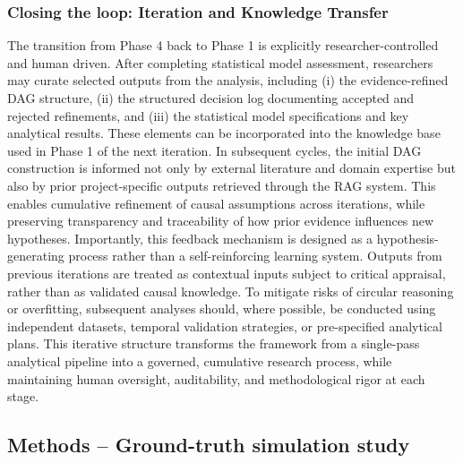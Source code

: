 \documentclass[sn-vancouver-num]{sn-jnl}
\begin{document}
\subsubsection{Closing the loop: Iteration and Knowledge Transfer}
The transition from Phase 4 back to Phase 1 is explicitly researcher-controlled and human driven. After completing statistical model assessment, researchers may curate selected outputs from the analysis, including (i) the evidence-refined DAG structure, (ii) the structured decision log documenting accepted and rejected refinements, and (iii) the statistical model specifications and key analytical results. These elements can be incorporated into the knowledge base used in Phase 1 of the next iteration. In subsequent cycles, the initial DAG construction is informed not only by external literature and domain expertise but also by prior project-specific outputs retrieved through the RAG system. This enables cumulative refinement of causal assumptions across iterations, while preserving transparency and traceability of how prior evidence influences new hypotheses. Importantly, this feedback mechanism is designed as a hypothesis-generating process rather than a self-reinforcing learning system. Outputs from previous iterations are treated as contextual inputs subject to critical appraisal, rather than as validated causal knowledge. To mitigate risks of circular reasoning or overfitting, subsequent analyses should, where possible, be conducted using independent datasets, temporal validation strategies, or pre-specified analytical plans. This iterative structure transforms the framework from a single-pass analytical pipeline into a governed, cumulative research process, while maintaining human oversight, auditability, and methodological rigor at each stage.

\subsection{Methods -- Ground-truth simulation study}
\end{document}
